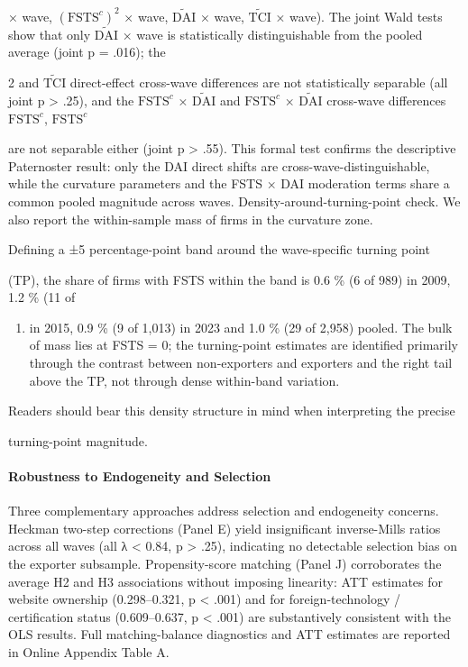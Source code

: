 \documentclass[12pt,a4paper]{article}
\providecommand{\tightlist}{\setlength{\itemsep}{0pt}\setlength{\parskip}{0pt}}
\begin{document}
× wave, \((\mathrm{FSTS}^{c})^2\) × wave, \(\tilde{\mathrm{DAI}}\) ×
wave, \(\tilde{\mathrm{TCI}}\) × wave). The joint Wald tests show that
only \(\tilde{\mathrm{DAI}}\) × wave is statistically distinguishable
from the pooled average (joint p = .016); the

2 and \(\tilde{\mathrm{TCI}}\) direct-effect cross-wave differences are
not statistically separable (all joint p \textgreater{} .25), and the
\(\mathrm{FSTS}^{c}\) × \(\tilde{\mathrm{DAI}}\) and
\(\mathrm{FSTS}^{c}\) × \(\tilde{\mathrm{DAI}}\) cross-wave differences
\(\mathrm{FSTS}^{c}\), \(\mathrm{FSTS}^{c}\)

are not separable either (joint p \textgreater{} .55). This formal test
confirms the descriptive Paternoster result: only the DAI direct shifts
are cross-wave-distinguishable, while the curvature parameters and the
FSTS × DAI moderation terms share a common pooled magnitude across
waves. Density-around-turning-point check. We also report the
within-sample mass of firms in the curvature zone.

Defining a ±5 percentage-point band around the wave-specific turning
point

(TP), the share of firms with FSTS within the band is 0.6 \% (6 of 989)
in 2009, 1.2 \% (11 of

\begin{enumerate}
\def\labelenumi{\arabic{enumi})}
\setcounter{enumi}{955}
\tightlist
\item
  in 2015, 0.9 \% (9 of 1,013) in 2023 and 1.0 \% (29 of 2,958) pooled.
  The bulk of mass lies at FSTS = 0; the turning-point estimates are
  identified primarily through the contrast between non-exporters and
  exporters and the right tail above the TP, not through dense
  within-band variation.
\end{enumerate}

Readers should bear this density structure in mind when interpreting the
precise

turning-point magnitude.

\hypertarget{robustness-to-endogeneity-and-selection}{%
\paragraph{Robustness to Endogeneity and
Selection}\label{robustness-to-endogeneity-and-selection}}

Three complementary approaches address selection and endogeneity
concerns. Heckman two-step corrections (Panel E) yield insignificant
inverse-Mills ratios across all waves (all \textbar λ\textbar{}
\textless{} 0.84, p \textgreater{} .25), indicating no detectable
selection bias on the exporter subsample. Propensity-score matching
(Panel J) corroborates the average H2 and H3 associations without
imposing linearity: ATT estimates for website ownership (0.298--0.321, p
\textless{} .001) and for foreign-technology / certification status
(0.609--0.637, p \textless{} .001) are substantively consistent with the
OLS results. Full matching-balance diagnostics and ATT estimates are
reported in Online Appendix Table A.
\end{document}

